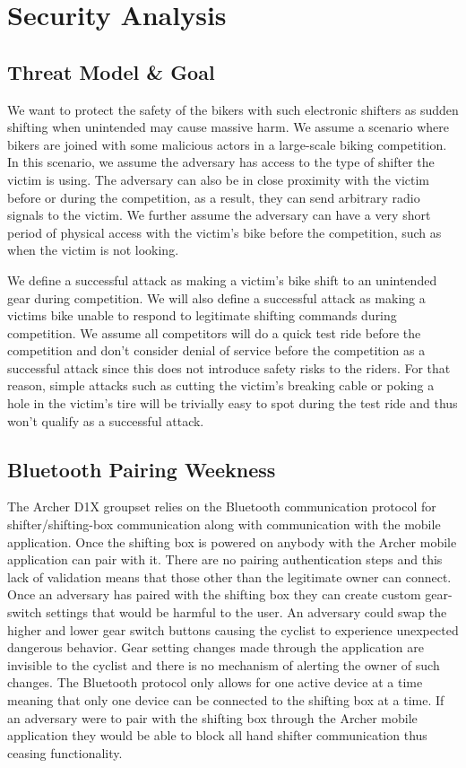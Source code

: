 \documentclass[letterpaper,twocolumn,10pt]{article}
\begin{document}
\section{Security Analysis}



\subsection{Threat Model \& Goal}
We want to protect the safety of the bikers with such electronic shifters as sudden shifting when unintended may cause massive harm. We assume a scenario where bikers are joined with some malicious actors in a large-scale biking competition. In this scenario, we assume the adversary has access to the type of shifter the victim is using. The adversary can also be in close proximity with the victim before or during the competition, as a result, they can send arbitrary radio signals to the victim. We further assume the adversary can have a very short period of physical access with the victim's bike before the competition, such as when the victim is not looking.

We define a successful attack as making a victim's bike shift to an unintended gear during competition. We will also define a successful attack as making a victims bike unable to respond to legitimate shifting commands during competition. We assume all competitors will do a quick test ride before the competition and don't consider denial of service before the competition as a successful attack since this does not introduce safety risks to the riders. For that reason, simple attacks such as cutting the victim's breaking cable or poking a hole in the victim's tire will be trivially easy to spot during the test ride and thus won't qualify as a successful attack.


\subsection{Bluetooth Pairing Weekness}

The Archer D1X groupset relies on the Bluetooth communication protocol for shifter/shifting-box communication along with communication with the mobile application. Once the shifting box is powered on anybody with the Archer mobile application can pair with it. There are no pairing authentication steps and this lack of validation means that those other than the legitimate owner can connect. Once an adversary has paired with the shifting box they can create custom gear-switch settings that would be harmful to the user. An adversary could swap the higher and lower gear switch buttons causing the cyclist to experience unexpected dangerous behavior. Gear setting changes made through the application are invisible to the cyclist and there is no mechanism of alerting the owner of such changes. The Bluetooth protocol only allows for one active device at a time meaning that only one device can be connected to the shifting box at a time. If an adversary were to pair with the shifting box through the Archer mobile application they would be able to block all hand shifter communication thus ceasing functionality.  
\end{document}
